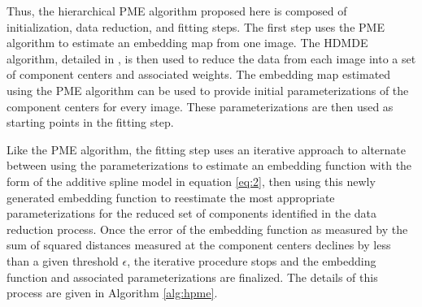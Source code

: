 \documentclass[11pt,reqno]{article}
\theoremstyle{definition}
\begin{document}
Thus, the hierarchical PME algorithm proposed here is composed of initialization, data reduction, and fitting steps. The first step uses the PME algorithm to estimate an embedding map from one image. The HDMDE algorithm, detailed in \cite{mengPrincipalManifoldEstimation2021}, is then used to reduce the data from each image into a set of component centers and associated weights. The embedding map estimated using the PME algorithm can be used to provide initial parameterizations of the component centers for every image. These parameterizations are then used as starting points in the fitting step. 

Like the PME algorithm, the fitting step uses an iterative approach to alternate between using the parameterizations to estimate an embedding function with the form of the additive spline model in equation \ref{eq:2}, then using this newly generated embedding function to reestimate the most appropriate parameterizations for the reduced set of components identified in the data reduction process. Once the error of the embedding function as measured by the sum of squared distances measured at the component centers declines by less than a given threshold $\epsilon$, the iterative procedure stops and the embedding function and associated parameterizations are finalized. The details of this process are given in Algorithm \ref{alg:hpme}.
\end{document}
